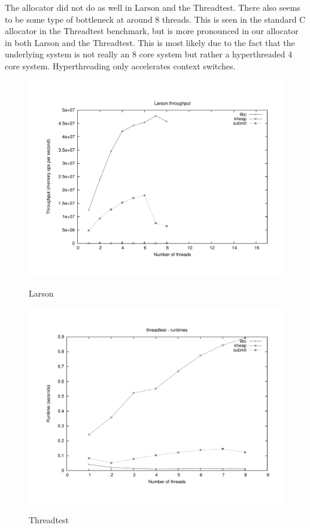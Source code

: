 \documentclass[oneside]{amsart}
\theoremstyle{definition}
\theoremstyle{remark}
\numberwithin{equation}{section}
\begin{document}
The allocator did not do as well in Larson and the Threadtest. There also seems to be some type of
bottleneck at around 8 threads. This is seen in the standard C allocator in the Threadtest
benchmark, but is more pronounced in our allocator in both Larson and the Threadtest. This is most
likely due to the fact that the underlying system is not really an 8 core system but rather a
hyperthreaded 4 core system. Hyperthreading only accelerates context switches.

\begin{figure}[h]
    \caption{Larson}
    \centering
    \includegraphics[scale=0.33]{../benchmarks/larson/larson.pdf}
    \label{fig:larson}
\end{figure}

\begin{figure}[h]
    \caption{Threadtest}
    \centering
    \includegraphics[scale=0.33]{../benchmarks/threadtest/threadtest.pdf}
    \label{fig:threadtest}
\end{figure}
\end{document}
